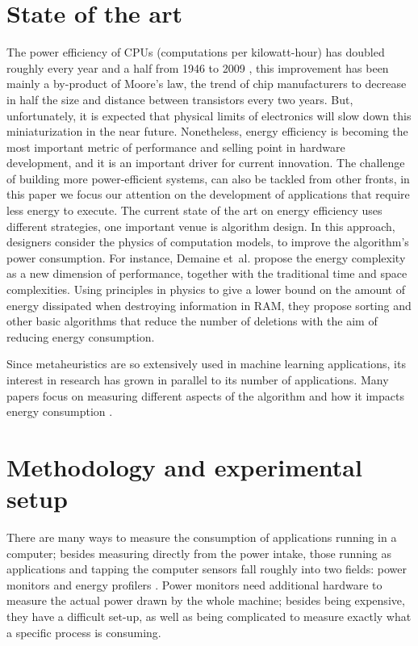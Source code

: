 \documentclass[a4paper,twoside]{article}
\begin{document}
\section{State of the art}


The power efficiency of CPUs (computations per kilowatt-hour) has doubled
roughly every year and a half from 1946 to 2009 \cite{koomey2011web}, this improvement
has been mainly a by-product of Moore's law, the trend of chip manufacturers to
decrease in half the size and distance between transistors every two
years. But, unfortunately, it is expected that physical limits of electronics will slow down this
miniaturization in the near future. Nonetheless, energy efficiency is becoming the most important
metric of performance and selling point in hardware development, and it is an important driver
for current innovation. The challenge of building more power-efficient systems, can also
be tackled from other fronts, in this paper we focus our attention on the development 
of applications that require less energy to execute. The current state of the art on 
energy efficiency uses different strategies, one important venue is algorithm design. In this 
approach, designers consider the physics of computation models, to improve the algorithm's 
power consumption.  For instance, Demaine et~al. \cite{demaine2016energy} 
propose the energy complexity as a new dimension of performance, together
with the traditional time and space complexities. Using principles in physics to give a lower
bound on the amount of energy dissipated when destroying information in RAM, they propose 
sorting and other basic algorithms that reduce the number of deletions with the aim of reducing energy consumption.

 
Since metaheuristics are so extensively used in machine learning applications,
its interest in research has grown in parallel to its number of applications.
Many papers focus on measuring different aspects of the algorithm and how it
impacts energy consumption \cite{diaz2022population}.

\section{Methodology and experimental setup}
\label{sec:setup}

There are many ways to measure the consumption of applications running in a
computer; besides measuring directly from the power intake, those running as
applications and tapping the computer sensors fall roughly into two fields:
power monitors and energy profilers \cite{cruz21}. Power monitors need
additional hardware to measure the actual power drawn by the whole machine;
besides being expensive, they have a difficult set-up, as well as being
complicated to measure exactly what a specific process is consuming.
\end{document}
